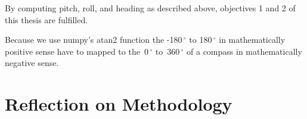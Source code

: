 By computing pitch, roll, and heading as described above, objectives 1 and 2 of this thesis are fulfilled.

Because we use numpy's atan2 function the -180\,$^\circ$ to 180\,$^\circ$ in mathematically positive sense have to mapped to the~0\,$^\circ$ to~360\,$^\circ$ of a compass in mathematically negative sense. 

\section{Reflection on Methodology \label{sec:meth:reflection_methodology}}